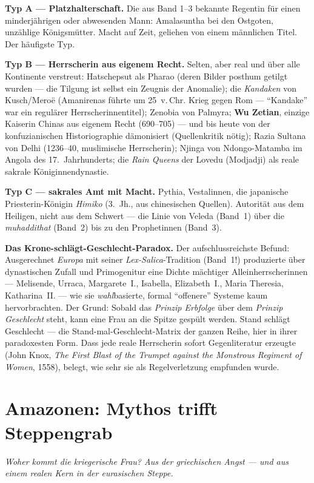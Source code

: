 \documentclass[11pt,a4paper,ngerman]{scrartcl}
\newcommand{\chipbase}[2]{\hspace{0pt}{\footnotesize\textcolor{#1}{[\textsc{#2}]}}}
\newcommand{\chipbelegt}[1]{\chipbase{chipgreen}{#1}}
\newcommand{\chipplausibel}[1]{\chipbase{chipamber}{#1}}
\begin{document}
\textbf{Typ A --- Platzhalterschaft.} Die aus Band 1--3 bekannte Regentin für einen minderjährigen oder abwesenden Mann: Amalasuntha bei den Ostgoten, unzählige Königsmütter. Macht auf Zeit, geliehen von einem männlichen Titel. Der häufigste Typ. \chipbelegt{belegt}

\textbf{Typ B --- Herrscherin aus eigenem Recht.} Selten, aber real und über alle Kontinente verstreut: Hatschepsut als Pharao (deren Bilder posthum getilgt wurden --- die Tilgung ist selbst ein Zeugnis der Anomalie); die \emph{Kandaken} von Kusch/Meroë (Amanirenas führte um 25~v.\,Chr. Krieg gegen Rom --- \enquote{Kandake} war ein regulärer Herrscherinnentitel); Zenobia von Palmyra; \textbf{Wu Zetian}, einzige Kaiserin Chinas aus eigenem Recht (690--705) --- und bis heute von der konfuzianischen Historiographie dämonisiert (Quellenkritik nötig); Razia Sultana von Delhi (1236--40, muslimische Herrscherin); Njinga von Ndongo-Matamba im Angola des 17.~Jahrhunderts; die \emph{Rain Queens} der Lovedu (Modjadji) als reale sakrale Königinnendynastie. \chipbelegt{belegt}

\textbf{Typ C --- sakrales Amt mit Macht.} Pythia, Vestalinnen, die japanische Priesterin-Königin \emph{Himiko} (3.~Jh., aus chinesischen Quellen). Autorität aus dem Heiligen, nicht aus dem Schwert --- die Linie von Veleda (Band~1) über die \emph{muhaddithat} (Band~2) bis zu den Prophetinnen (Band~3). \chipbelegt{belegt}

\textbf{Das Krone-schlägt-Geschlecht-Paradox.} Der aufschlussreichste Befund: Ausgerechnet \emph{Europa} mit seiner \emph{Lex-Salica}-Tradition (Band~1!) produzierte über dynastischen Zufall und Primogenitur eine Dichte mächtiger Alleinherrscherinnen --- Melisende, Urraca, Margarete~I., Isabella, Elizabeth~I., Maria Theresia, Katharina~II. --- wie sie \emph{wahl}basierte, formal \enquote{offenere} Systeme kaum hervorbrachten. Der Grund: Sobald das \emph{Prinzip Erbfolge} über dem \emph{Prinzip Geschlecht} steht, kann eine Frau an die Spitze gespült werden. Stand schlägt Geschlecht --- die Stand-mal-Geschlecht-Matrix der ganzen Reihe, hier in ihrer paradoxesten Form. \chipplausibel{plausibel} Dass jede reale Herrscherin sofort Gegenliteratur erzeugte (John Knox, \emph{The First Blast of the Trumpet against the Monstrous Regiment of Women}, 1558), belegt, wie sehr sie als Regelverletzung empfunden wurde. \chipbelegt{belegt}

\section{Amazonen: Mythos trifft Steppengrab}
\noindent\textit{Woher kommt die kriegerische Frau? Aus der griechischen Angst --- und aus einem realen Kern in der eurasischen Steppe.}
\medskip
\end{document}
